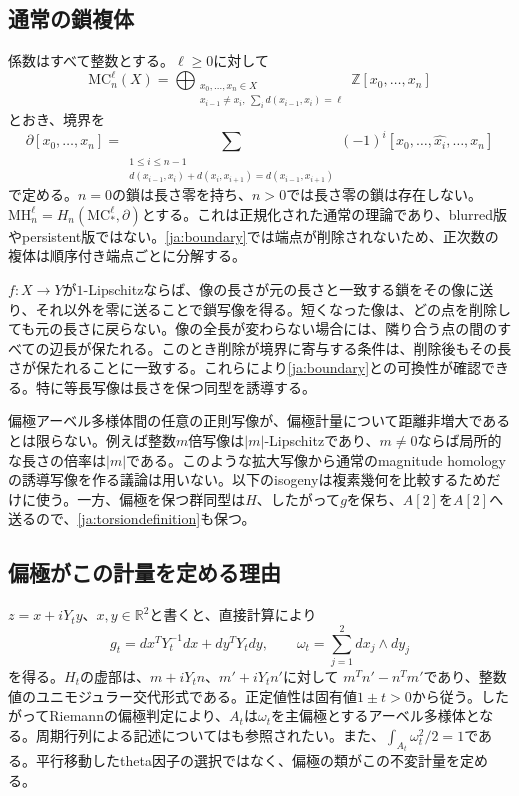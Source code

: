 \documentclass[12pt]{amsart}
\theoremstyle{definition}
\theoremstyle{remark}
\numberwithin{equation}{section}
\newcommand{\R}{\mathbb{R}}
\newcommand{\Z}{\mathbb{Z}}
\newcommand{\MH}{\mathrm{MH}}
\newcommand{\MC}{\mathrm{MC}}
\begin{document}
\subsection{通常の鎖複体}
係数はすべて整数とする。$\ell\geq0$に対して
\begin{equation}\label{ja:chains}
\MC_n^\ell(X)=
\bigoplus_{\substack{x_0,\ldots,x_n\in X\\
x_{i-1}\ne x_i,\ \sum_i d(x_{i-1},x_i)=\ell}}
\Z[x_0,\ldots,x_n]
\end{equation}
とおき、境界を
\begin{equation}\label{ja:boundary}
\partial[x_0,\ldots,x_n]=
\sum_{\substack{1\leq i\leq n-1\\
d(x_{i-1},x_i)+d(x_i,x_{i+1})=d(x_{i-1},x_{i+1})}}
(-1)^i[x_0,\ldots,\widehat{x_i},\ldots,x_n]
\end{equation}
で定める。$n=0$の鎖は長さ零を持ち、$n>0$では長さ零の鎖は存在しない。$\MH_n^\ell=H_n(\MC_*^\ell,\partial)$とする。これは正規化された通常の理論であり、blurred版やpersistent版ではない。\eqref{ja:boundary}では端点が削除されないため、正次数の複体は順序付き端点ごとに分解する。

$f:X\to Y$が$1$-Lipschitzならば、像の長さが元の長さと一致する鎖をその像に送り、それ以外を零に送ることで鎖写像を得る\cite[\S1.3]{ja:BK}。短くなった像は、どの点を削除しても元の長さに戻らない。像の全長が変わらない場合には、隣り合う点の間のすべての辺長が保たれる。このとき削除が境界に寄与する条件は、削除後もその長さが保たれることに一致する。これらにより\eqref{ja:boundary}との可換性が確認できる。特に等長写像は長さを保つ同型を誘導する。

偏極アーベル多様体間の任意の正則写像が、偏極計量について距離非増大であるとは限らない。例えば整数$m$倍写像は$|m|$-Lipschitzであり、$m\ne0$ならば局所的な長さの倍率は$|m|$である。このような拡大写像から通常のmagnitude homologyの誘導写像を作る議論は用いない。以下のisogenyは複素幾何を比較するためだけに使う。一方、偏極を保つ群同型は$H$、したがって$g$を保ち、$A[2]$を$A[2]$へ送るので、\eqref{ja:torsiondefinition}も保つ。

\subsection{偏極がこの計量を定める理由}
$z=x+iY_ty$、$x,y\in\R^2$と書くと、直接計算により
\begin{equation}\label{ja:realmetric}
g_t=dx^TY_t^{-1}dx+dy^TY_tdy,\qquad
\omega_t=\sum_{j=1}^2dx_j\wedge dy_j
\end{equation}
を得る。$H_t$の虚部は、$m+iY_tn$、$m'+iY_tn'$に対して
$m^Tn'-n^Tm'$であり、整数値のユニモジュラー交代形式である。正定値性は固有値$1\pm t>0$から従う。したがってRiemannの偏極判定により、$A_t$は$\omega_t$を主偏極とするアーベル多様体となる。周期行列による記述については\cite[Lecture 5, p.~4; Lecture 7, pp.~1--3]{ja:Schnell}も参照されたい。また、$\int_{A_t}\omega_t^2/2=1$である。平行移動したtheta因子の選択ではなく、偏極の類がこの不変計量を定める。
\end{document}
